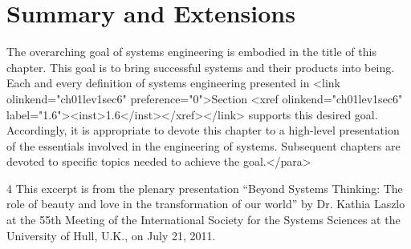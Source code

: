 \section{Summary and Extensions}

The overarching goal of systems engineering is embodied in the title of this chapter. This goal is to bring successful systems and their products into being. Each and every definition of systems
engineering presented in <link olinkend="ch01lev1sec6" preference="0">Section <xref olinkend="ch01lev1sec6" label="1.6"><inst>1.6</inst></xref></link> supports this desired goal. Accordingly, it is appropriate to devote this chapter to a high-level presentation of the essentials involved in the engineering of systems. Subsequent chapters are devoted to specific topics needed to achieve the goal.</para>


4 This excerpt is from the plenary presentation “Beyond Systems Thinking: The role of beauty and love in the transformation of our world” by Dr. Kathia Laszlo at the 55th Meeting of the International Society for the Systems Sciences at the University of Hull, U.K., on July 21, 2011.


